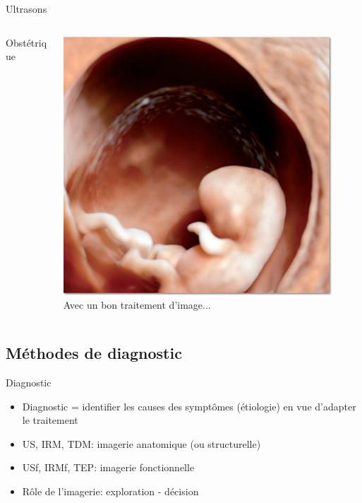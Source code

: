 \documentclass{beamer}
\begin{document}
\begin{frame}{Ultrasons}
\begin{columns}[T]
\begin{column}{0.32\textwidth}
Obstétrique
 \end{column}
 \begin{column}{0.32\textwidth}
 \centering
\includegraphics[width=0.9\textwidth]{images/echo3dhd.jpg}\\
Avec un bon traitement d'image...
 \end{column}\end{columns} 
\end{frame}
\subsection{Méthodes de diagnostic}
\begin{frame}{Diagnostic}
\begin{itemize}
 \item Diagnostic = identifier les causes des symptômes (étiologie) en vue d'adapter le traitement
 \item US, IRM, TDM: imagerie anatomique (ou structurelle)
 \item USf, IRMf, TEP: imagerie fonctionnelle
 \item Rôle de l'imagerie: exploration - décision
\end{itemize}
\end{frame}
\end{document}

